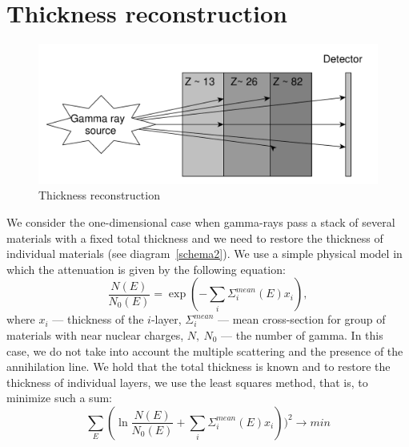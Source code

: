 \documentclass[a4paper]{panl}
\begin{document}
\section*{Thickness reconstruction}
\begin{figure} 
    \includegraphics[width=\linewidth]{figures/yed_schema_2.pdf}
    \vspace{-3mm}
    \caption{Thickness reconstruction}
    \vspace{-5mm}
\end{figure}
We consider the one-dimensional case when gamma-rays pass a stack of several materials with a fixed total thickness and we need to restore the thickness of individual materials (see diagram~\ref{schema2}). We use a simple physical model in which the attenuation is given by the following equation:
\begin{equation}
\label{eq:gamma}
\frac{N(E)}{N_0(E)} = \exp(-\sum_i \Sigma^{mean}_i(E)x_i),
\end{equation}
where $x_i$ --- thickness of the $i$-layer, $\Sigma^{mean}_i$ --- mean cross-section for group of materials with near nuclear charges, $N,~N_0$ --- the number of gamma. In this case, we do not take into account the multiple scattering and the presence of the annihilation line. We hold that the total thickness is known and to restore the thickness of individual layers, we use the least squares method, that is, to minimize such a sum:
\begin{equation}
\sum_E(\ln \frac{N(E)}{N_0(E)} + \sum_i \Sigma^{mean}_i(E)x_i))^2 \to min
\end{equation}
\end{document}
